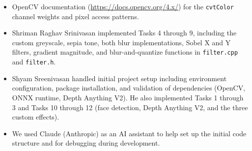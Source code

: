 \documentclass[11pt,letterpaper]{article}
\begin{document}
\begin{itemize}
    \item OpenCV documentation (\url{https://docs.opencv.org/4.x/}) for
        the \texttt{cvtColor} channel weights and pixel access patterns.
    \item Shriman Raghav Srinivasan implemented Tasks 4 through 9, including
        the custom greyscale, sepia tone, both blur implementations, Sobel X
        and Y filters, gradient magnitude, and blur-and-quantize functions in
        \texttt{filter.cpp} and \texttt{filter.h}.
    \item Shyam Sreenivasan handled initial project setup including environment
        configuration, package installation, and validation of dependencies
        (OpenCV, ONNX runtime, Depth Anything V2). He also implemented Tasks 1
        through 3 and Tasks 10 through 12 (face detection, Depth Anything V2,
        and the three custom effects).
    \item We used Claude (Anthropic) as an AI assistant to help set up the
        initial code structure and for debugging during development.
\end{itemize}
\end{document}

